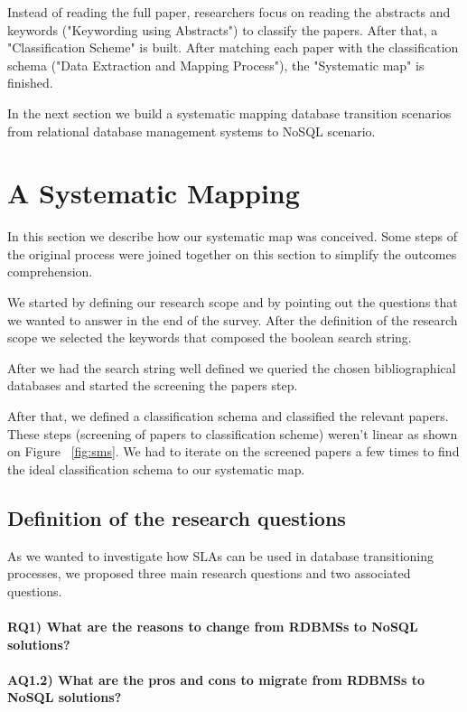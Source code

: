 \documentclass{article}
\begin{document}
Instead of reading the full paper, researchers focus on reading the abstracts and keywords ("Keywording using Abstracts") to classify the papers. After that, a "Classification Scheme" is built. After matching each paper with the classification schema ("Data Extraction and Mapping Process"), the  "Systematic map" is finished. 


In the next section we build a systematic mapping database transition scenarios from relational database management systems to NoSQL scenario.


\section{A Systematic Mapping}
\label{sec:asm}

In this section we describe how our systematic map was conceived. 
Some steps of the original process were joined together on this section to simplify the outcomes comprehension.

We started by defining our research scope and by pointing out the questions that we wanted to answer in the end of the survey. After the definition of the research scope we selected the keywords that composed the boolean search string.

After we had the search string well defined we queried the chosen bibliographical databases and started the screening the papers step.

After that, we defined a classification schema and classified the relevant papers. These steps (screening of papers to classification scheme) weren't linear as shown on Figure ~\ref{fig:sms}. We had to iterate on the screened papers a few times to find the ideal classification schema to our systematic map. 

\subsection{Definition of the research questions}

As we wanted to investigate how SLAs can be used in database transitioning processes, we proposed three main research questions and two associated questions.

\paragraph*{\textbf{RQ1)} What are the reasons to change from RDBMSs to NoSQL solutions?}
\paragraph*{\textbf{AQ1.2)} What are the pros and cons to migrate from RDBMSs to NoSQL solutions?}
\end{document}
